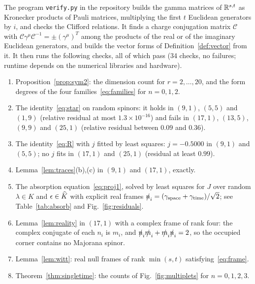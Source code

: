 The program \texttt{verify.py} in the repository builds the gamma matrices of $\mathbb{R}^{s,t}$ as Kronecker products of Pauli matrices, multiplying the first $t$ Euclidean generators by $i$, and checks the Clifford relations. It finds a charge conjugation matrix $\mathcal C$ with $\mathcal C\gamma^\mu\mathcal C^{-1}=\pm(\gamma^\mu)^T$ among the products of the real or of the imaginary Euclidean generators, and builds the vector forms of Definition~\ref{def:vector} from it. It then runs the following checks, all of which pass (34 checks, no failures; runtime depends on the numerical libraries and hardware).
\begin{enumerate}[label=(\alph*)]
\item Proposition~\ref{prop:sym2}: the dimension count for $r=2,\dots,20$, and the form degrees of the four families~\eqref{eq:families} for $n=0,1,2$.
\item The identity~\eqref{eq:star} on random spinors: it holds in $(9,1)$, $(5,5)$ and $(1,9)$ (relative residual at most $1.3\times10^{-16}$) and fails in $(17,1)$, $(13,5)$, $(9,9)$ and $(25,1)$ (relative residual between $0.09$ and $0.36$).
\item The identity~\eqref{eq:R} with $j$ fitted by least squares: $j=-0.5000$ in $(9,1)$ and $(5,5)$; no $j$ fits in $(17,1)$ and $(25,1)$ (residual at least $0.99$).
\item Lemma~\ref{lem:traces}(b),(c) in $(9,1)$ and $(17,1)$, exactly.
\item The absorption equation~\eqref{eq:proj1}, solved by least squares for $J$ over random $\lambda\in K$ and $\epsilon\in\widehat{K}$ with explicit real frames $\slashed{n}_i=(\gamma_{\text{space}}+\gamma_{\text{time}})/\sqrt2$; see Table~\ref{tab:absorb} and Fig.~\ref{fig:residuals}.
\item Lemma~\ref{lem:reality} in $(17,1)$ with a complex frame of rank four: the complex conjugate of each $n_i$ is $m_i$, and $\slashed{n}_i\slashed{m}_i+\slashed{m}_i\slashed{n}_i=2$, so the occupied corner contains no Majorana spinor.
\item Lemma~\ref{lem:witt}: real null frames of rank $\min(s,t)$ satisfying~\eqref{eq:frame}.
\item Theorem~\ref{thm:singletime}: the counts of Fig.~\ref{fig:multiplets} for $n=0,1,2,3$.
\end{enumerate}

